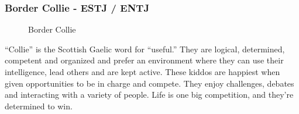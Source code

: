 \subsubsection{Border Collie - ESTJ / ENTJ}
\begin{figure}[htbp!]
	\centering
	\caption[Border Collie]{Border Collie}
	\label{img:Border_Collie}
\end{figure}
“Collie” is the Scottish Gaelic word for “useful.” They are logical, determined, competent and organized and prefer an environment where they can use their intelligence, lead others and are kept active. These kiddos are happiest when given opportunities to be in charge and compete. They enjoy challenges, debates and interacting with a variety of people. Life is one big competition, and they're determined to win. \\
